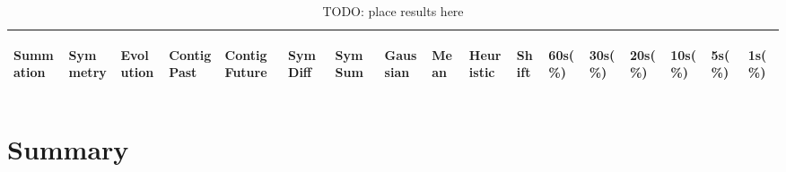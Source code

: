 \documentclass[twocolumn]{article}
\begin{document}
\begin{table}[t]
	\centering
	\begin{tabular}{|llllllll|lll|llllll|}
		\hline 
		
		\begin{sideways}Summation\end{sideways}&\begin{sideways}Symmetry\end{sideways} &\begin{sideways}Evolution\end{sideways}&\begin{sideways}Contig Past\end{sideways} &\begin{sideways}Contig Future\end{sideways}&\begin{sideways}Sym Diff\end{sideways}&\begin{sideways}Sym Sum\end{sideways} &\begin{sideways}Gaussian\end{sideways} &  \begin{sideways}Mean\end{sideways} & \begin{sideways}Heuristic\end{sideways} & \begin{sideways}Shift\end{sideways} & \begin{sideways}60s(\%)\end{sideways} & \begin{sideways}30s(\%)\end{sideways} & \begin{sideways}20s(\%)\end{sideways} & \begin{sideways}10s(\%)\end{sideways} & \begin{sideways}5s(\%)\end{sideways} & \begin{sideways}1s(\%)\end{sideways}    \\ \hline 
		
		
		
		\hline 
	\end{tabular}
	\caption{TODO: place results here}
\end{table}


\section{Summary}\label{conclusions}
\end{document}
